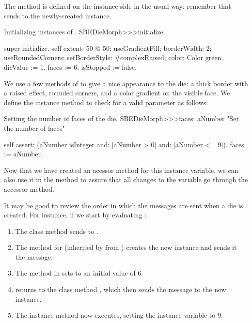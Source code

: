 \documentclass[a4paper,10pt,twoside]{book}
\begin{document}
The  method is defined on the instance side in the usual way; remember that  sends  to the newly-created instance.
\begin{method}{Initializing instances of .}
SBEDieMorph>>>initialize

	super initialize.
	self
		extent: 50 @ 50;
		useGradientFill; borderWidth: 2; useRoundedCorners;
		setBorderStyle: #complexRaised;
		color: Color green.
	dieValue := 1.
	faces := 6.
	isStopped := false.
\end{method}

We use a few methods of  to give a nice appearance to the die: a thick border with a raised effect, rounded corners, and a color gradient on the visible face.
We define the instance method  to check for a valid parameter as follows:

\begin{method}{Setting the number of faces of the die.}
SBEDieMorph>>>faces: aNumber
	"Set the number of faces"

	self assert: (aNumber isInteger and: [aNumber > 0] and: [aNumber <= 9]).
	faces := aNumber.
\end{method}

Now that we have created an acessor method for this instance variable, we can also use it in the  method to assure that all changes to the variable go through the accessor method.

It may be good to review the order in which the messages are sent when a die is created.
For instance, if we start by evaluating :
\begin{enumerate}
	\item The class method  sends  to .
	\item The method for  (inherited by  from ) creates the new instance and sends it the  message.
	\item The  method in  sets  to an initial value of 6.
	\item {} returns to the class method , which then sends the message  to the new instance.
	\item The instance method  now executes, setting the  instance variable to 9.
\end{enumerate}
\end{document}
